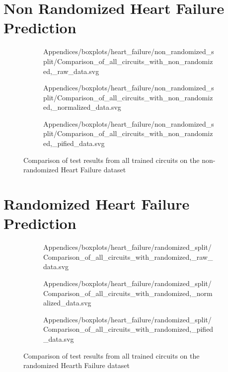 \clearpage 
\section{Non Randomized Heart Failure Prediction}
\label{chapter:heart_failure_prediction_non_randomized}

\begin{figure}[!h]
    \begin{subfigure}{.5\textwidth}
        \centering
        
        {Appendices/boxplots/heart_failure/non_randomized_split/Comparison_of_all_circuits_with_non_randomized,_raw_data.svg}
    \end{subfigure}
    \begin{subfigure}{.5\textwidth}
        \centering
        
        {Appendices/boxplots/heart_failure/non_randomized_split/Comparison_of_all_circuits_with_non_randomized,_normalized_data.svg}
    \end{subfigure}
    \begin{subfigure}{.5\textwidth}
        \centering
        
        {Appendices/boxplots/heart_failure/non_randomized_split/Comparison_of_all_circuits_with_non_randomized,_pified_data.svg}
    \end{subfigure}
    \caption{Comparison of test results from all trained circuits on the non-randomized Heart Failure dataset}
    \label{fig:circuits_results_non_r_hf}
\end{figure}

\clearpage 
\section{Randomized Heart Failure Prediction}
\label{chapter:heart_failure_prediction_randomized}

\begin{figure}[!h]
    \begin{subfigure}{.5\textwidth}
        \centering
        
        {Appendices/boxplots/heart_failure/randomized_split/Comparison_of_all_circuits_with_randomized,_raw_data.svg}
    \end{subfigure}
    \begin{subfigure}{.5\textwidth}
        \centering
        
        {Appendices/boxplots/heart_failure/randomized_split/Comparison_of_all_circuits_with_randomized,_normalized_data.svg}
    \end{subfigure}
    \begin{subfigure}{.5\textwidth}
        \centering
        
        {Appendices/boxplots/heart_failure/randomized_split/Comparison_of_all_circuits_with_randomized,_pified_data.svg}
    \end{subfigure}
    \caption{Comparison of test results from all trained circuits on the randomized Hearth Failure dataset}
    \label{fig:circuits_results_r_hf}
\end{figure}

